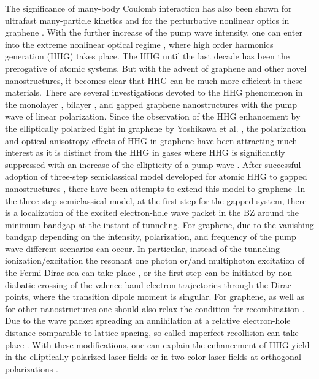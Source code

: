\documentclass[reprint, superscriptaddress,  aps, pra]{revtex4-2}
\begin{document}
The significance of many-body Coulomb interaction has also been shown for
ultrafast many-particle kinetics \cite{Knorr1,Knorr2,Knorr-book} and for the
perturbative nonlinear optics in graphene \cite{Sun-Wu,Sun,Cheng,Rostami}.
With the further increase of the pump wave intensity, one can enter into the
extreme nonlinear optical regime \cite{Avetissian-book}, where high order
harmonics generation (HHG) takes place. The HHG until the last decade has
been the prerogative of atomic systems. But with the advent of graphene and
other novel nanostructures, it becomes clear that HHG can be much more
efficient in these materials. There are several investigations devoted to
the HHG phenomenon in the monolayer \cite%
{Mikh-Ziegler,Mer,H4,Al-Naib,H7,H8,H10,Mer18,Zurr}, bilayer \cite{H3,Du,H16}%
, and gapped graphene \cite{H11,2019} nanostructures with the pump wave of
linear polarization. Since the observation of the HHG enhancement by the
elliptically polarized light in graphene by Yoshikawa et al. \cite{Yoshikawa}
, the polarization and optical anisotropy effects of HHG in graphene have
been attracting much interest \cite{Liu,H12,H13,H14,H15,Wang,Feng,Mer2022}
as it is distinct from the HHG in gases where HHG is significantly
suppressed with an increase of the ellipticity of a pump wave \cite{Budil}.
After successful adoption of three-step semiclassical model developed for
atomic HHG \cite{Lewenstein} to gapped nanostructures \cite{Vampa2014,Vampa}%
, there have been attempts to extend this model to graphene \cite%
{Zurr,Feng,2019-2,Mer2022}.In the three-step semiclassical model, at the
first step for the gapped system, there is a localization of the excited
electron-hole wave packet in the BZ around the minimum bandgap at the
instant of tunneling. For graphene, due to the vanishing bandgap depending
on the intensity, polarization, and frequency of the pump wave different
scenarios can occur. In particular, instead of the tunneling
ionization/excitation the resonant one photon or/and multiphoton excitation
of the Fermi-Dirac sea can take place \cite{Mer}, or the first step can be
initiated by non-diabatic crossing \cite{Zurr} of the valence band electron
trajectories through the Dirac points, where the transition dipole moment is
singular. For graphene, as well as for other nanostructures one should also
relax the condition for recombination \cite{Feng,Mer2022}. Due to the wave
packet spreading an annihilation at a relative electron-hole distance
comparable to lattice spacing, so-called imperfect recollision can take
place \cite{Gaarde}. With these modifications, one can explain the
enhancement of HHG yield in the elliptically polarized laser fields \cite%
{Feng} or in two-color laser fields at orthogonal polarizations \cite%
{Mer2022}.
\end{document}
